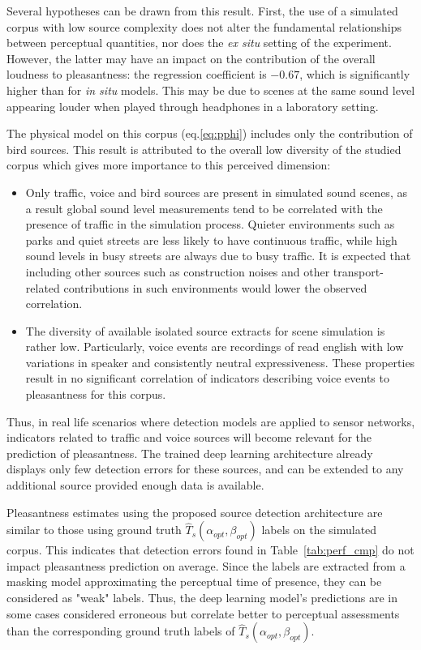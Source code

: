 \documentclass[twocolumn]{article}
\begin{document}
Several hypotheses can be drawn from this result. First, the use of a simulated corpus with low source complexity does not alter the fundamental relationships between perceptual quantities, nor does the \textit{ex situ} setting of the experiment. However, the latter may have an impact on the contribution of the overall loudness to pleasantness: the regression coefficient is $-0.67$, which is significantly higher than for \textit{in situ} models. This may be due to scenes at the same sound level appearing louder when played through headphones in a laboratory setting.

The physical model on this corpus (eq.\ref{eq:pphi}) includes only the contribution of bird sources. This result is attributed to the overall low diversity of the studied corpus which gives more importance to this perceived dimension:
\begin{itemize}
\item Only traffic, voice and bird sources are present in simulated sound scenes, as a result global sound level measurements tend to be correlated with the presence of traffic in the simulation process. Quieter environments such as parks and quiet streets are less likely to have continuous traffic, while high sound levels in busy streets are always due to busy traffic. It is expected that including other sources such as construction noises and other transport-related contributions in such environments would lower the observed correlation.
\item The diversity of available isolated source extracts for scene simulation is rather low. Particularly, voice events are recordings of read english with low variations in speaker and consistently neutral expressiveness. These properties result in no significant correlation of indicators describing voice events to pleasantness for this corpus.
\end{itemize}
Thus, in real life scenarios where detection models are applied to sensor networks, indicators related to traffic and voice sources will become relevant for the prediction of pleasantness. The trained deep learning architecture already displays only few detection errors for these sources, and can be extended to any additional source provided enough data is available.

Pleasantness estimates using the proposed source detection architecture are similar to those using ground truth $\hat T_s(\alpha_{opt}, \beta_{opt})$ labels on the simulated corpus. This indicates that detection errors found in Table~\ref{tab:perf_cmp} do not impact pleasantness prediction on average. Since the labels are extracted from a masking model approximating the perceptual time of presence, they can be considered as "weak" labels. Thus, the deep learning model's predictions are in some cases considered erroneous but correlate better to perceptual assessments than the corresponding ground truth labels of $\hat T_s(\alpha_{opt}, \beta_{opt})$.
\end{document}
